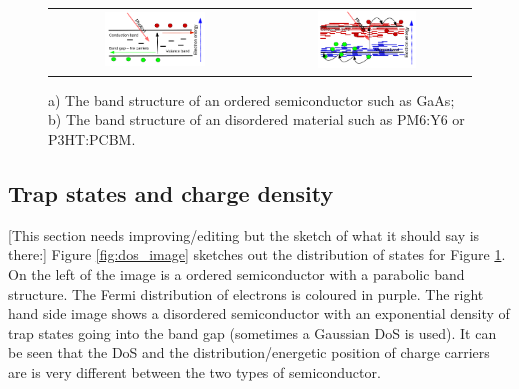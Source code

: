 \begin{figure}[H]
\centering
\begin{tabular}{ c c }


\includegraphics[width=0.5\textwidth,height=0.32\textwidth]{./images/electrical/ordered.png}

&
\includegraphics[width=0.5\textwidth,height=0.32\textwidth]{./images/electrical/disordered.png}
\\
\end{tabular}
\caption{a) The band structure of an ordered semiconductor such as GaAs; b) The band structure of an disordered material such as PM6:Y6 or P3HT:PCBM.}
\label{fig:band_structure}
\end{figure}

\subsection{Trap states and charge density}
[This section needs improving/editing but the sketch of what it should say is there:]
Figure \ref{fig:dos_image} sketches out the distribution of states for Figure \ref{fig:band_structure}. On the left of the image is a ordered semiconductor with a parabolic band structure. The Fermi distribution of electrons is coloured in purple. The right hand side image shows a disordered semiconductor with an exponential density of trap states going into the band gap (sometimes a Gaussian DoS is used).  It can be seen that the DoS and the distribution/energetic position of charge carriers are is very different between the two types of semiconductor.


